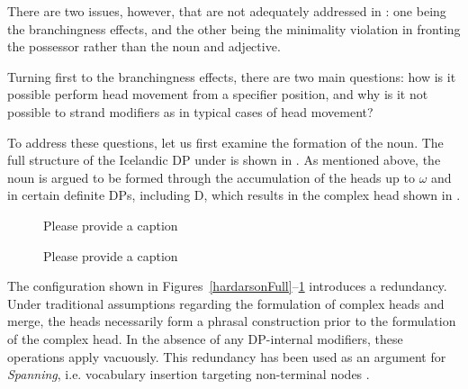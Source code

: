 \documentclass[output=paper,colorlinks,citecolor=brown,
]{langscibook}
\begin{document}
There are two issues, however, that are not adequately addressed in \citet{Hardarson:2016wd}: one being the branchingness effects, and the other being the minimality violation in fronting the possessor rather than the noun and adjective.

Turning first to the branchingness effects, there are two main questions: how is it possible perform head movement from a specifier position, and why is it not possible to strand modifiers as in typical cases of head movement?

To address these questions, let us first examine the formation of the noun. The full structure of the Icelandic DP under \citet{Hardarson:2016wd} is shown in . As mentioned above, the noun is argued to be formed through the accumulation of the heads up to $\omega$  and in certain definite DPs, including D, which results in the complex head shown in .

\begin{figure}
\begin{floatrow}
	{\caption{\color{red}Please provide a caption}\label{hardarsonFull}}
	{\caption{\color{red}Please provide a caption}\label{hardarsonFullN}}
\end{floatrow}
\end{figure}

The configuration shown in Figures~\ref{hardarsonFull}--\ref{hardarsonFullN} introduces a redundancy. Under traditional assumptions regarding the formulation of complex heads and merge, the heads necessarily form a phrasal construction prior to the formulation of the complex head. In the absence of any DP-internal modifiers, these operations apply vacuously. This redundancy has been used as an argument for \textit{Spanning}, i.e. vocabulary insertion targeting non-terminal nodes \citep[e.g.,][]{svenonius2016}.
\end{document}
